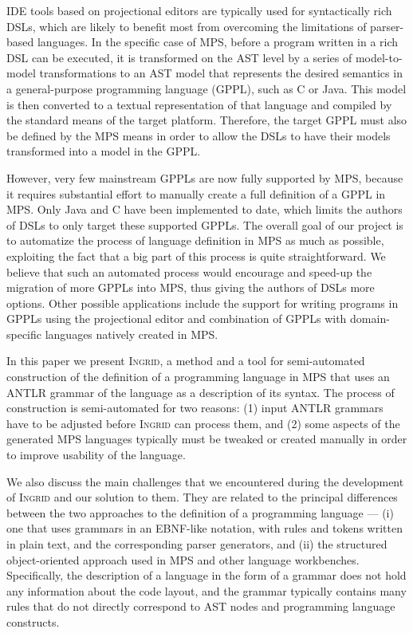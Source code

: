 
IDE tools based on projectional editors are typically used for syntactically rich DSLs, which are likely to benefit most from overcoming the limitations of parser-based languages.
In the specific case of MPS, before a program written in a rich DSL can be executed, it is transformed on the AST level by a series of model-to-model transformations to an AST model that represents the desired semantics in a general-purpose programming language (GPPL), such as C or Java.
This model is then converted to a textual representation of that language and compiled by the standard means of the target platform.
Therefore, the target GPPL must also be defined by the MPS means in order to allow the DSLs to have their models transformed into a model in the GPPL.

However, very few mainstream GPPLs are now fully supported by MPS, because it requires substantial effort to manually create a full definition of a GPPL in MPS.
Only Java and C have been implemented to date, which limits the authors of DSLs to only target these supported GPPLs.
The overall goal of our project is to automatize the process of language definition in MPS as much as possible, exploiting the fact that a big part of this process is quite straightforward.
We believe that such an automated process would encourage and speed-up the migration of more GPPLs into MPS, thus giving the authors of DSLs more options.
Other possible applications include the support for writing programs in GPPLs using the projectional editor and combination of GPPLs with domain-specific languages natively created in MPS.

In this paper we present \textsc{Ingrid}, a method and a tool for semi-automated construction of the definition of a programming language in MPS that uses an ANTLR grammar of the language as a description of its syntax.
The process of construction is semi-automated for two reasons: (1) input ANTLR grammars have to be adjusted before \textsc{Ingrid} can process them, and (2) some aspects of the generated MPS languages typically must be tweaked or created manually in order to improve usability of the language.

We also discuss the main challenges that we encountered during the development of \textsc{Ingrid} and our solution to them.
They are related to the principal differences between the two approaches to the definition of a programming language --- (i) one that uses grammars in an EBNF-like notation, with rules and tokens written in plain text, and the corresponding parser generators, and (ii) the structured object-oriented approach used in MPS and other language workbenches.
Specifically, the description of a language in the form of a grammar does not hold any information about the code layout, and the grammar typically contains many rules that do not directly correspond to AST nodes and programming language constructs.

